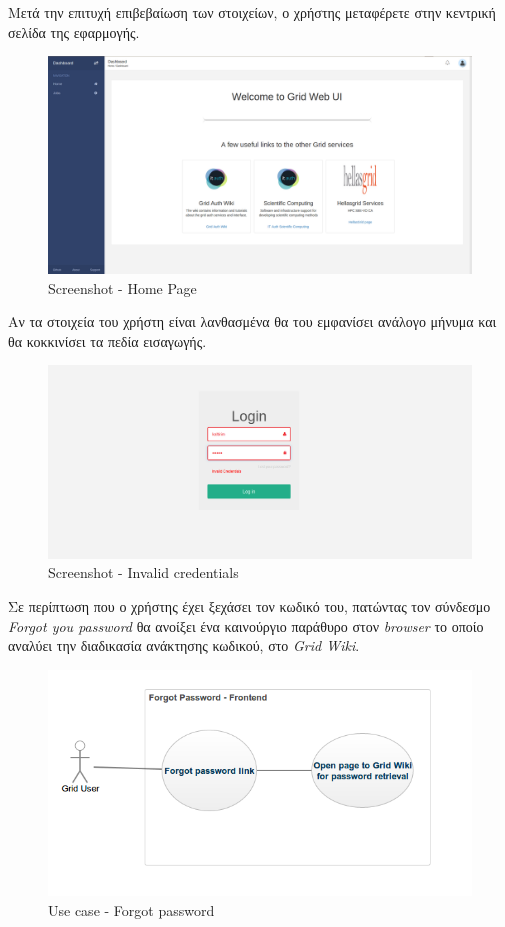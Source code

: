 Μετά την επιτυχή επιβεβαίωση των στοιχείων, ο χρήστης μεταφέρετε στην κεντρική σελίδα της εφαρμογής.

\begin{figure}[t]
\caption{Screenshot - Home Page}
\includegraphics[width=16cm]{../images/home-page-screenshot.png}
\centering
\end{figure}
\clearpage


Αν τα στοιχεία του χρήστη είναι λανθασμένα θα του εμφανίσει ανάλογο μήνυμα και θα κοκκινίσει τα πεδία εισαγωγής.

\begin{figure}[t]
\caption{Screenshot - Invalid credentials}
\includegraphics[width=16cm]{../images/invalid-credentials-screenshot.png}
\centering
\end{figure}
\clearpage

Σε περίπτωση που ο χρήστης έχει ξεχάσει τον κωδικό του, πατώντας τον σύνδεσμο \textit{Forgot you password} θα ανοίξει ένα καινούργιο παράθυρο στον \textit{browser} το οποίο αναλύει την διαδικασία ανάκτησης κωδικού, στο \textit{Grid Wiki}.

\begin{figure}[t]
\caption{Use case - Forgot password}
\includegraphics[width=16cm]{../images/forgot-password-case.png}
\centering
\end{figure}
\clearpage


